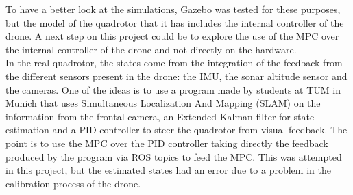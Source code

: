 To have a better look at the simulations, Gazebo was tested for these purposes, but the model of the quadrotor that it has includes the internal controller of the drone. A next step on this project could be to explore the use of the MPC over the internal controller of the drone and not directly on the hardware.\\

In the real quadrotor, the states come from the integration of the feedback from the different sensors present in the drone: the IMU, the sonar altitude sensor and the cameras. One of the ideas is to use a program made by students at TUM in Munich that uses Simultaneous Localization And Mapping (SLAM) on the information from the frontal camera, an Extended Kalman filter for state estimation and a PID controller to steer the quadrotor from visual feedback. The point is to use the MPC over the PID controller taking directly the feedback produced by the program via ROS topics to feed the MPC. This was attempted in this project, but the estimated states had an error due to a problem in the calibration process of the drone.\\










